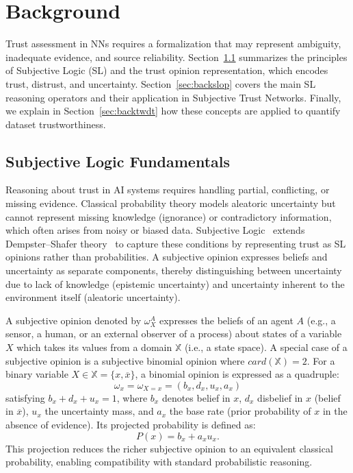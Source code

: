 \vspace{-0.5em}
\section{Background}\label{sec:back}
Trust assessment in NNs requires a formalization that may represent ambiguity, inadequate evidence, and source reliability. Section~\ref{sec:backsl} summarizes the principles of Subjective Logic (SL) and the trust opinion representation, which encodes trust, distrust, and uncertainty. Section~\ref{sec:backslop} covers the main SL reasoning operators and their application in Subjective Trust Networks. Finally, we explain in Section~\ref{sec:backtwdt} how these concepts are applied to quantify dataset trustworthiness.
\vspace{-0.5em}
\subsection{Subjective Logic Fundamentals}\label{sec:backsl}
Reasoning about trust in AI systems requires handling partial, conflicting, or missing evidence. Classical probability theory models aleatoric uncertainty but cannot represent missing knowledge (ignorance) or contradictory information, which often arises from noisy or biased data.
Subjective Logic~\cite{josang2016subjective} extends Dempster–Shafer theory~\cite{dempster1967upper,shafer1976mathematical} to capture these conditions by representing trust as SL opinions rather than probabilities. A subjective opinion expresses beliefs and uncertainty as separate components, thereby distinguishing between uncertainty due to lack of knowledge (epistemic uncertainty) and uncertainty inherent to the environment itself (aleatoric uncertainty).

A subjective opinion denoted by \(\omega_X^A\) expresses the beliefs of an agent \(A\) (e.g., a sensor, a human, or an external observer of a process) about states of a variable $X$ which takes its values from a domain $\mathbb{X}$ (i.e., a state space). A special case of a subjective opinion is a subjective binomial opinion where $card(\mathbb{X})=2$. For a binary variable $X \in \mathbb{X} = \{x, \overline{x}\}$, a binomial opinion is expressed as a quadruple:
\vspace{-0.5em}
\begin{equation}
\omega_x = \omega_{X=x} = (b_x, d_x, u_x, a_x)
\end{equation}
satisfying $b_x + d_x + u_x = 1$, where $b_x$ denotes belief in $x$, $d_x$ disbelief in $x$ (belief in \(\overline{x}\)), $u_x$ the uncertainty mass, and $a_x$ the base rate (prior probability of $x$ in the absence of evidence). Its projected probability is defined as:
\vspace{-0.5em}
\begin{equation}
P(x) = b_x + a_x u_x.
\label{eq:projected_prob}
\end{equation}
This projection reduces the richer subjective opinion to an equivalent classical probability, enabling compatibility with standard probabilistic reasoning.

